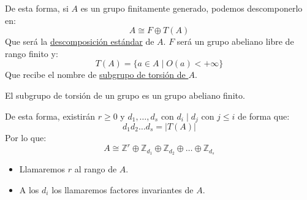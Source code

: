 \noindent
De esta forma, si $A$ es un grupo finitamente generado, podemos descomponerlo en:
\begin{equation*}
    A\cong F \oplus T(A)
\end{equation*}
Que será la \underline{descomposición estándar} de $A$. $F$ será un grupo abeliano libre de rango finito y:
\begin{equation*}
    T(A) = \{a\in A \mid O(a) < +\infty\}
\end{equation*}
Que recibe el nombre de \underline{subgrupo de torsión de $A$}. %

\begin{prop}
    El subgrupo de torsión de un grupo es un grupo abeliano finito.
\end{prop}
De esta forma, existirán $r\geq 0$ y $d_1,\ldots,d_s$ con $d_i\mid d_j$ con $j\leq i$ de forma que:
\begin{equation*}
    d_1d_2\ldots d_s = |T(A)|
\end{equation*}
Por lo que:
\begin{equation*}
    A \cong \mathbb{Z}^r \oplus \mathbb{Z}_{d_1} \oplus \mathbb{Z}_{d_2} \oplus \ldots \oplus \mathbb{Z}_{d_s}
\end{equation*}

\begin{itemize}
    \item Llamaremos $r$ al rango de $A$.
    \item A los $d_i$ los llamaremos factores invariantes de $A$.
\end{itemize}

